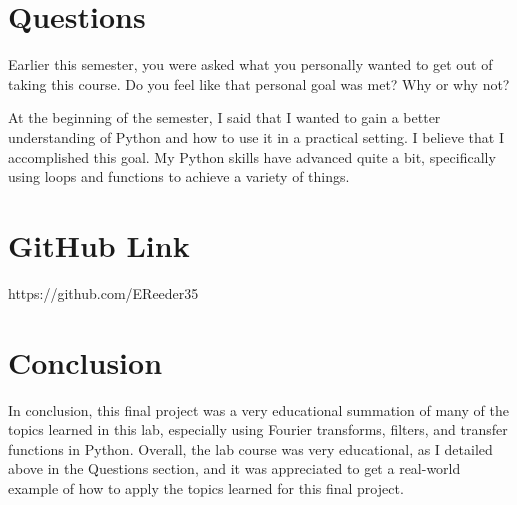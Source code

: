\documentclass[12pt]{article}
\begin{document}
\section{Questions}

Earlier this semester, you were asked what you personally wanted to get out of taking this course. Do you feel like that personal goal was met? Why or why not?

At the beginning of the semester, I said that I wanted to gain a better understanding of Python and how to use it in a practical setting. I believe that I accomplished this goal. My Python skills have advanced quite a bit, specifically using loops and functions to achieve a variety of things.

\section{GitHub Link}

https://github.com/EReeder35

\section{Conclusion}

In conclusion, this final project was a very educational summation of many of the topics learned in this lab, especially using Fourier transforms, filters, and transfer functions in Python. Overall, the lab course was very educational, as I detailed above in the Questions section, and it was appreciated to get a real-world example of how to apply the topics learned for this final project.
\end{document}
